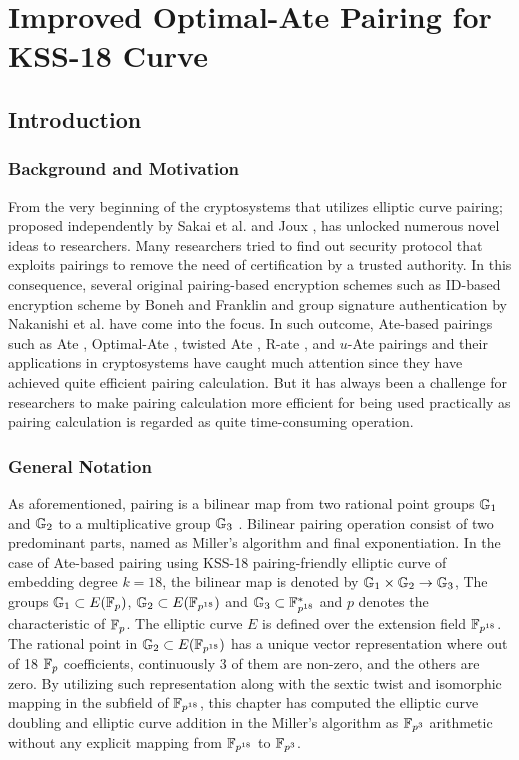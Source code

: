 \chapter{Improved Optimal-Ate Pairing for KSS-18 Curve} 
\label{ch:optate_kss18_icisc2016}

\section{Introduction}
\label{ch:icisc2016:intro}

\subsection{Background and Motivation}
\label{sec:ch:icisc:bac_motivation}
From the very beginning of the cryptosystems that utilizes elliptic curve pairing; proposed independently by Sakai et al. \cite{EPRINT:SakKas03} and Joux \cite{JC:Joux04}, has unlocked numerous novel ideas to researchers. 
Many researchers tried to find out security protocol that exploits pairings to remove the need of certification by a trusted authority. 
In this consequence, several original pairing-based encryption schemes such as ID-based encryption scheme by  Boneh and Franklin \cite{C:BonFra01} and group signature authentication by Nakanishi et al. \cite{AC:NakFun05} have come into the focus. 
In such outcome, Ate-based pairings such as Ate \cite{DBLP:reference/crc/2005ehcc}, Optimal-Ate \cite{DBLP:journals/tit/Vercauteren10}, twisted Ate \cite{EPRINT:MKHO07},  R-ate \cite{r_ate}, and $u$-Ate \cite{PAIRING:NASKM08} pairings and their applications in cryptosystems have caught much attention since they have achieved quite efficient pairing calculation.
But it has always been a challenge for researchers to make pairing calculation more efficient for being used practically as pairing calculation is regarded as quite time-consuming operation. 

\subsection{General Notation}
\label{sec:ch:icisc:notation}
As aforementioned, pairing is a bilinear map from two rational point groups ${\mathbb{G}}_{1}$ and ${\mathbb{G}}_{2}$ to a multiplicative group ${\mathbb{G}}_{3}$ \cite{Silverman}.
Bilinear pairing operation consist of two predominant parts,  named as Miller's algorithm and final exponentiation.
In  the case of  Ate-based pairing using KSS-18 pairing-friendly elliptic curve of embedding degree $k=18$,  the bilinear map is denoted by ${\mathbb{G}}_{1} \times {\mathbb{G}}_{2} \rightarrow {\mathbb{G}}_{3}$,
The groups ${\mathbb{G}}_{1} \subset E(\mathbb{F}_p)$, ${\mathbb{G}}_{2} \subset E(\mathbb{F}_{p^{18}})$ and ${\mathbb{G}}_{3}  \subset \mathbb{F}^*_{p^{18}}$ and  $p$ denotes the characteristic of ${\mathbb{F}}_{p}$.
 The elliptic curve $E$ is defined over the extension field $\mathbb{F}_{p^{18}}$. 
The rational point in ${\mathbb{G}}_{2} \subset E(\mathbb{F}_{p^{18}})$ has a unique vector representation where out of 18 ${\mathbb{F}}_{p}$ coefficients, continuously 3 of them are non-zero, and the others are zero. 
By utilizing such representation along with the sextic twist and isomorphic mapping in the subfield of $\mathbb{F}_{p^{18}}$, this chapter has computed the elliptic curve doubling and elliptic curve addition in the Miller's algorithm as $\mathbb{F}_{p^3}$ arithmetic without any explicit mapping from $\mathbb{F}_{p^{18}}$ to $\mathbb{F}_{p^3}$.

